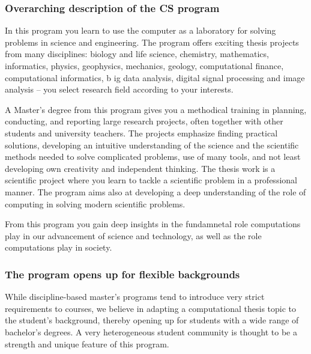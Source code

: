\documentclass{beamer}
\begin{document}
\begin{frame}
\frametitle{Overarching description of the CS program}

\begin{block}{}
In this program you learn to use the computer as a laboratory for
solving problems in science and engineering. The program offers
exciting thesis projects from many disciplines: biology and life
science, chemistry, mathematics, informatics, physics, geophysics,
mechanics, geology, computational finance, computational informatics, b
ig data analysis, digital signal processing
and image analysis – you select research field according to
your interests.

A Master’s degree from this program gives you a methodical
training in planning, conducting, and reporting large research
projects, often together with other students and university teachers.
The projects emphasize finding practical solutions, developing an
intuitive understanding of the science and the scientific methods
needed to solve complicated problems, use of many tools, and not least
developing own creativity and independent thinking. The thesis
work is a scientific project where you learn to tackle a
scientific problem in a professional manner.   The program aims also at
developing a deep understanding of the role of computing in solving modern scientific
problems. 

From this program you gain  deep insights in the fundamnetal role
computations play  in our advancement of science and technology, as well as the role computations play  in society.

\end{block}
\end{frame}

\begin{frame}
\frametitle{The program opens up for flexible backgrounds}

\begin{block}{}
While discipline-based master's programs tend to introduce very strict
requirements to courses, we believe in adapting a computational thesis
topic to the student's background, thereby opening up for
students with a wide range of bachelor's degrees.
A very heterogeneous student community is thought to be a strength and
unique feature of this program.
\end{block}
\end{frame}
\end{document}
